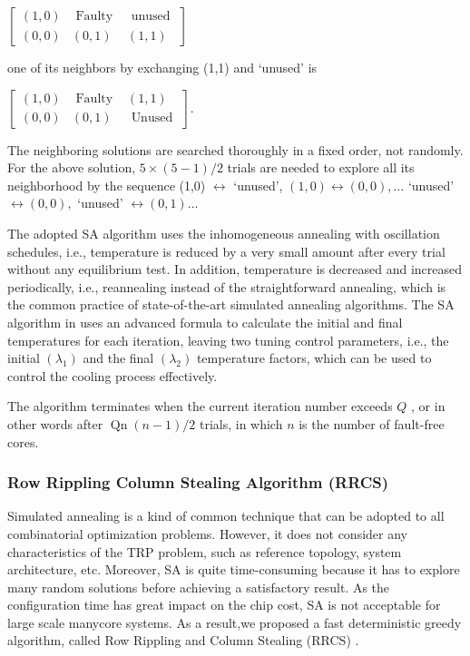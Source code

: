 \begin{center}
        $\left[\begin{array}{ccc}(1,0) & \text { Faulty } & \text { unused } \\ (0,0) & (0,1) & (1,1)\end{array}\right]$
\end{center}

one of its neighbors by exchanging (1,1) and ‘unused’ is

\begin{center}
        $\left[\begin{array}{ccc}(1,0) & \text { Faulty } & (1,1) \\ (0,0) & (0,1) & \text { Unused }\end{array}\right] .$
\end{center}

The neighboring solutions are searched thoroughly in a fixed order, not randomly. For the above solution, $5 \times(5-1) / 2$ trials are needed to explore all its neighborhood by the sequence (1,0)  $\leftrightarrow$ ‘unused’, $(1,0) \leftrightarrow(0,0), \ldots$ ‘unused’ $\leftrightarrow(0,0),$ ‘unused’ $\leftrightarrow(0,1) \ldots$

The adopted SA algorithm uses the inhomogeneous annealing with oscillation schedules, i.e., temperature is reduced by a very small amount after every trial without any equilibrium test. In addition, temperature is decreased and increased periodically, i.e., reannealing instead of the straightforward annealing, which is the common practice of state-of-the-art simulated annealing algorithms.
The SA algorithm in \cite{misevivcius2003modified} uses an advanced formula to calculate the initial and final temperatures for each iteration, leaving two tuning control parameters, i.e., the initial $\left(\lambda_{1}\right)$ and the final  $\left(\lambda_{2}\right)$ temperature factors, which can be used to control the cooling process effectively.

The algorithm terminates when the current iteration number exceeds $Q$ , or in other words after    $\operatorname{Qn}(n-1) / 2$ trials, in which $n$ is the number of fault-free cores.

\subsubsection{Row Rippling Column Stealing Algorithm (RRCS)}
Simulated annealing is a kind of common technique that can be adopted to all combinatorial optimization problems. However, it does not consider any characteristics of the TRP problem, such as reference topology, system architecture, etc. Moreover, SA is quite time-consuming because it has to explore many random solutions before achieving a satisfactory result. As the configuration time has great impact on the chip cost, SA is not acceptable for large scale manycore systems. As a result,we proposed a fast deterministic greedy algorithm, called Row Rippling and Column Stealing (RRCS) \cite{zhang2007fault}.


